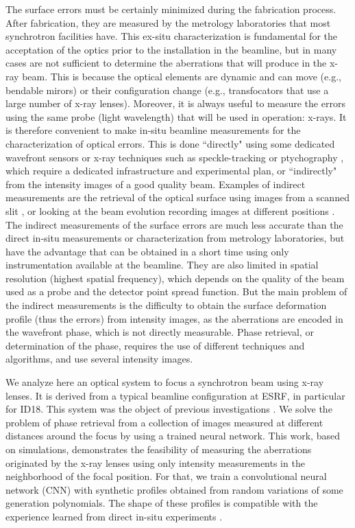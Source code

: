 \documentclass[preprint]{iucr}
\begin{document}
The surface errors must be certainly minimized during the fabrication process. After fabrication, they are measured by the metrology laboratories that most synchrotron facilities have. This ex-situ characterization is fundamental for the acceptation of the optics prior to the installation in the beamline, but in many cases are not sufficient to determine the aberrations that will produce in the x-ray beam. This is because the optical elements are dynamic and can move (e.g., bendable mirors) or their configuration change (e.g., transfocators that use a large number of x-ray lenses). Moreover, it is always useful to measure the errors using the same probe (light wavelength) that will be used in operation: x-rays. It is therefore convenient to make in-situ beamline measurements for the characterization of optical errors. This is done ``directly" using some dedicated wavefront sensors or x-ray techniques such as speckle-tracking \cite{berujon_theory_2020, berujon_experiments_2020} or ptychography \cite{Pfeiffer2018-au}, which require a dedicated infrastructure and experimental plan, or ``indirectly" from the intensity images of a good quality beam. Examples of indirect measurements are the retrieval of the optical surface using images from a scanned slit \cite{Zhang:ve5019}, or looking at the beam evolution recording images at different positions \cite{Celestre:yi5119}. The indirect measurements of the surface errors are much less accurate than the direct in-situ measurements or characterization from metrology laboratories, but have the advantage that can be obtained in a short time using only instrumentation available at the beamline. They are also limited in spatial resolution (highest spatial frequency), which depends on the quality of the beam used as a probe and the detector point spread function. But the main problem of the indirect measurements is the difficulty to obtain the surface deformation profile (thus the errors) from intensity images, as the aberrations are encoded in the wavefront phase, which is not directly measurable. Phase retrieval, or determination of the phase, requires the use of different techniques and algorithms, and use several intensity images.

We analyze here an optical system to focus a synchrotron beam using x-ray lenses. It is derived from a typical beamline configuration at ESRF, in particular for ID18. This system was the object of previous investigations \cite{SanchezdelRio:ay5600}. We solve the problem of phase retrieval from a collection of images measured at different distances around the focus by using a trained neural network. This work, based on simulations, demonstrates the feasibility of measuring the aberrations originated by the x-ray lenses using only intensity measurements in the neighborhood of the focal position. For that, we train a convolutional neural network (CNN) with synthetic profiles obtained from random variations of some generation polynomials. The shape of these profiles is compatible with the experience learned from direct in-situ experiments \cite{Celestre:yi5119}. 
\end{document}
